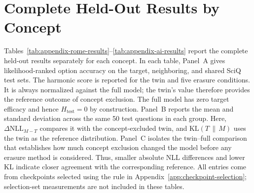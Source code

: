 \section{Complete Held-Out Results by Concept}
\label{app:full-results}

Tables~\ref{tab:appendix-rome-results}--\ref{tab:appendix-ai-results} report the
complete held-out results separately for each concept. In each table, Panel~A
gives likelihood-ranked option accuracy on the target, neighboring, and shared
SciQ test sets. The harmonic score is reported
for the twin and five erasure conditions. It is always normalized against the
full model; the twin's value therefore provides the reference outcome of
concept exclusion. The full model has zero target efficacy and hence
$H_{\mathrm{test}}=0$ by construction. Panel~B reports the mean and standard deviation
across the same 50 test questions in each group. Here,
$\Delta\mathrm{NLL}_{M-T}$ compares it with the concept-excluded twin, and
$\mathrm{KL}(T\,\|\,M)$ uses the twin as the reference distribution. Panel~C
isolates the twin--full comparison that establishes how much concept exclusion
changed the model before any erasure method is considered. Thus, smaller
absolute NLL differences and lower KL indicate closer agreement with the
corresponding reference. All entries come from checkpoints selected using the
rule in Appendix~\ref{app:checkpoint-selection}; selection-set measurements are not
included in these tables.

